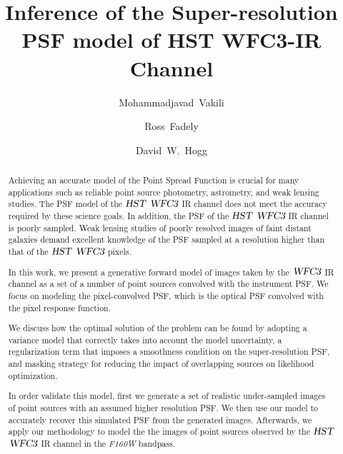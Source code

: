 \documentclass[onecolumn]{aastex61}
\newcommand{\project}[1]{{\textsl{#1}}}
\newcommand{\hst}{\project{HST}}
\newcommand{\wfc}{\project{WFC3}}
\begin{document}
\title{Inference of the Super-resolution PSF model of HST WFC3-IR Channel}

\author{Mohammadjavad~Vakili}
\author{Ross~Fadely}
\author{David~W.~Hogg}

\begin{abstract}
Achieving an accurate model of the Point Spread Function is crucial for many applications such as reliable point source photometry, astrometry, and weak lensing studies.
The PSF model of the $\hst$ $\wfc$ IR channel does not meet the accuracy required by these science goals. 
In addition, the PSF of the $\hst$ $\wfc$ IR channel is poorly sampled. Weak lensing studies of poorly resolved images of faint distant galaxies demand 
excellent knowledge of the PSF sampled at a resolution higher than that of the $\hst$ $\wfc$ pixels.

In this work, we present a generative forward model of images taken by the $\wfc$ IR channel as a set of a number of point sources convolved
with the instrument PSF. We focus on modeling the pixel-convolved PSF, which is the optical PSF convolved with the pixel response function. 

We discuss how the optimal solution of the problem can be found by adopting a variance model that correctly takes into account the model uncertainty, a regularization term that imposes a smoothness condition on the super-resolution PSF, and masking strategy for reducing the impact of overlapping sources on likelihood optimization.

In order validate this model, first we generate a set of realistic under-sampled images of point sources with an assumed higher resolution PSF. We then use our model to accurately recover this simulated PSF from the generated images. Afterwards, we apply our methodology to model the the images of point sources observed by the $\hst$ $\wfc$ IR channel in the \emph{F160W} bandpass. 

\end{abstract}
\end{document}
